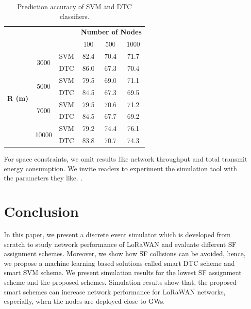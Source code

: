 \documentclass[conference]{IEEEtran}
\begin{document}
\begin{table}
\centering
\caption{Prediction accuracy of SVM and DTC classifiers.}
\label{table:prediction_accuracy}
\begin{tabular}{|c|c|c|c|c|c|}
\hline
\multicolumn{3}{|c|}{\multirow{2}{*}{}}                        & \multicolumn{3}{c|}{\textbf{Number of Nodes}} \\ \cline{4-6}
\multicolumn{3}{|c|}{}                                         & 100           & 500           & 1000          \\ \hline
\multirow{8}{*}{\textbf{R (m)}} & \multirow{2}{*}{3000}  & SVM & 82.4          & 70.4          & 71.7          \\ \cline{3-6}
                                &                        & DTC & 86.0          & 67.3          & 70.4          \\ \cline{2-6}

                                & \multirow{2}{*}{5000}  & SVM & 79.5          & 69.0          & 71.1          \\ \cline{3-6}
                                &                        & DTC & 84.5          & 67.3          & 69.5          \\ \cline{2-6}

                                & \multirow{2}{*}{7000}  & SVM & 79.5          & 70.6          & 71.2          \\ \cline{3-6}
                                &                        & DTC & 84.5          & 67.7          & 69.2          \\ \cline{2-6}

                                & \multirow{2}{*}{10000} & SVM & 79.2          & 74.4          & 76.1          \\ \cline{3-6}
                                &                        & DTC & 83.8          & 70.7          & 74.3          \\ \hline
\end{tabular}
\end{table}

\par For space constraints, we omit results like network throughput and total transmit energy consumption. We invite readers to experiment the simulation tool with the parameters they like. \cite{simlorasf}.


\section{Conclusion} \label{Conclusion}
\par In this paper, we present a discrete event simulator which is developed from scratch to study network performance of LoRaWAN and evaluate different SF assignment schemes. Moreover, we show how SF collisions can be avoided, hence, we propose a machine learning based solutions called smart DTC scheme and smart SVM scheme. We present simulation results for the lowest SF assignment scheme and the proposed schemes. Simulation results show that, the proposed smart schemes can increase network performance for LoRaWAN networks, especially, when the nodes are deployed close to GWs.
\end{document}
